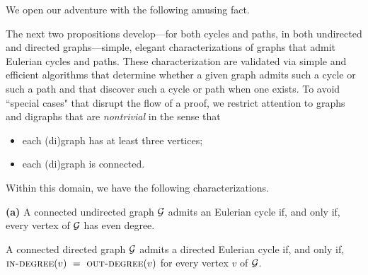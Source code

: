\smallskip

We open our adventure with the following amusing fact.

\bigskip


\noindent {}

\bigskip

The next two propositions develop---for both cycles and paths, in both undirected and directed graphs---simple, elegant characterizations of graphs that admit Eulerian cycles and paths.
These characterization are validated via simple and efficient algorithms that determine whether a given graph admits such a cycle or such a path and that discover such a cycle or path when one exists.  To avoid ``special cases" that disrupt the flow of a proof, we restrict attention to graphs and digraphs that are {\em nontrivial} in the sense that
\begin{itemize}
\item
each (di)graph has at least three vertices;
\medskip\item
each (di)graph is connected.
\end{itemize}
Within this domain, we have the following characterizations.

\begin{prop}
\label{thm:eulerian-cycle}
{\bf (a)}
A connected undirected graph $\mbox{$\cal G$}$ admits an Eulerian cycle if, and only if, every vertex of $\mbox{$\cal G$}$ has even degree.

\smallskip

A connected directed graph $\mbox{$\cal G$}$ admits a directed Eulerian cycle if, and only if, $\mbox{\sc in-degree}(v) \ = \ \mbox{\sc out-degree}(v)$ for every vertex $v$ of $\mbox{$\cal G$}$.
\end{prop}

